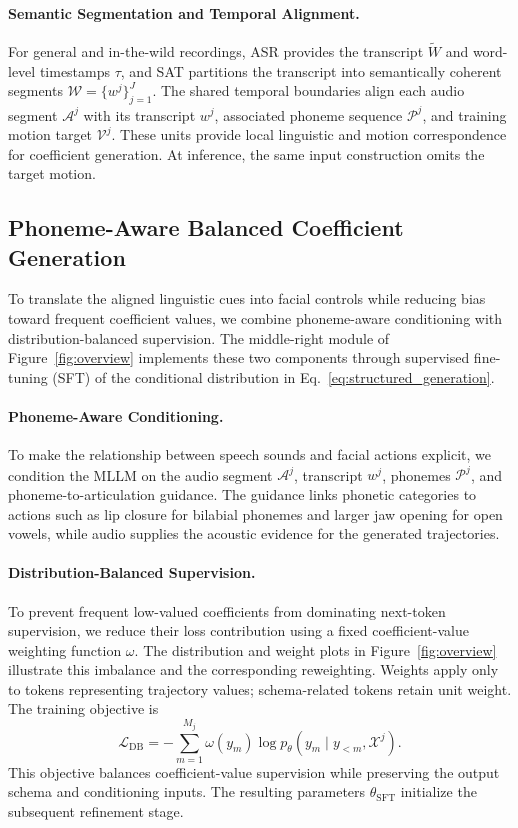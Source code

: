 \paragraph{Semantic Segmentation and Temporal Alignment.}
For general and in-the-wild recordings, ASR provides the transcript $\tilde{W}$ and word-level timestamps $\tau$, and SAT partitions the transcript into semantically coherent segments $\mathcal{W}=\{w^j\}_{j=1}^{J}$.
The shared temporal boundaries align each audio segment $\mathcal{A}^j$ with its transcript $w^j$, associated phoneme sequence $\mathcal{P}^j$, and training motion target $\mathcal{V}^j$.
These units provide local linguistic and motion correspondence for coefficient generation. At inference, the same input construction omits the target motion.

\subsection{Phoneme-Aware Balanced Coefficient Generation}
\label{sec:stage2}

To translate the aligned linguistic cues into facial controls while reducing bias toward frequent coefficient values, we combine phoneme-aware conditioning with distribution-balanced supervision.
The middle-right module of Figure~\ref{fig:overview} implements these two components through supervised fine-tuning (SFT) of the conditional distribution in Eq.~\ref{eq:structured_generation}.

\paragraph{Phoneme-Aware Conditioning.}
To make the relationship between speech sounds and facial actions explicit, we condition the MLLM on the audio segment $\mathcal{A}^j$, transcript $w^j$, phonemes $\mathcal{P}^j$, and phoneme-to-articulation guidance.
The guidance links phonetic categories to actions such as lip closure for bilabial phonemes and larger jaw opening for open vowels, while audio supplies the acoustic evidence for the generated trajectories.

\paragraph{Distribution-Balanced Supervision.}
To prevent frequent low-valued coefficients from dominating next-token supervision, we reduce their loss contribution using a fixed coefficient-value weighting function $\omega$.
The distribution and weight plots in Figure~\ref{fig:overview} illustrate this imbalance and the corresponding reweighting.
Weights apply only to tokens representing trajectory values; schema-related tokens retain unit weight.
The training objective is
\begin{equation}
\mathcal{L}_{\mathrm{DB}} = -\sum_{m=1}^{M_j}\omega(y_m)\log p_\theta(y_m\mid y_{<m},\mathcal{X}^j).
\label{eq:db_sft}
\end{equation}
This objective balances coefficient-value supervision while preserving the output schema and conditioning inputs.
The resulting parameters $\theta_{\mathrm{SFT}}$ initialize the subsequent refinement stage.

